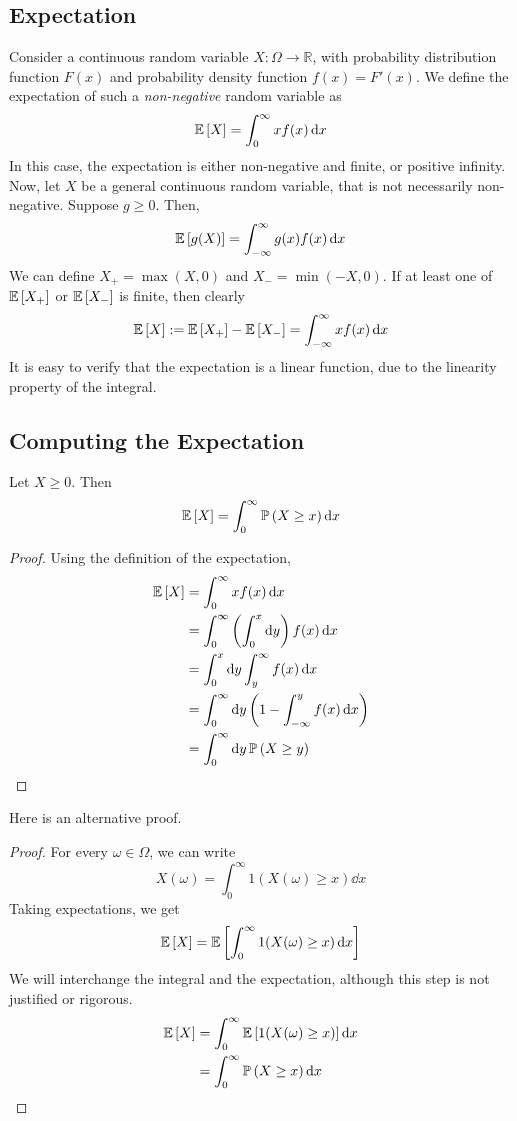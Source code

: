 \subsection{Expectation}
Consider a continuous random variable \(X \colon \Omega \to \mathbb R\), with probability distribution function \(F(x)\) and probability density function \(f(x) = F'(x)\).
We define the expectation of such a \textit{non-negative} random variable as
\[
	\mathbb{E}\left[{X}\right] = \int_0^\infty x f(x) \dd{x}
\]
In this case, the expectation is either non-negative and finite, or positive infinity.
Now, let \(X\) be a general continuous random variable, that is not necessarily non-negative.
Suppose \(g \geq 0\).
Then,
\[
	\mathbb{E}\left[{g(X)}\right] = \int_{-\infty}^\infty g(x) f(x) \dd{x}
\]
We can define \(X_+ = \max(X, 0)\) and \(X_- = \min(-X, 0)\).
If at least one of \(\mathbb{E}\left[{X_+}\right]\) or \(\mathbb{E}\left[{X_-}\right]\) is finite, then clearly
\[
	\mathbb{E}\left[{X}\right] := \mathbb{E}\left[{X_+}\right] - \mathbb{E}\left[{X_-}\right] = \int_{-\infty}^\infty xf(x) \dd{x}
\]
It is easy to verify that the expectation is a linear function, due to the linearity property of the integral.

\subsection{Computing the Expectation}
\begin{claim}
	Let \(X \geq 0\).
	Then
	\[
		\mathbb{E}\left[{X}\right] = \int_0^\infty \mathbb{P}\left({X \geq x}\right) \dd{x}
	\]
\end{claim}
\begin{proof}
	Using the definition of the expectation,
	\begin{align*}
		\mathbb{E}\left[{X}\right] & = \int_0^\infty xf(x) \dd{x}                                           \\
		           & = \int_0^\infty \left( \int_0^x \dd{y} \right) f(x) \dd{x}             \\
		           & = \int_0^x \dd{y} \int_y^\infty f(x) \dd{x}                            \\
		           & = \int_0^\infty \dd{y} \left( 1 - \int_{-\infty}^y f(x) \dd{x} \right) \\
		           & = \int_0^\infty \dd{y} \mathbb{P}\left({X \geq y}\right)
	\end{align*}
\end{proof}
\noindent Here is an alternative proof.
\begin{proof}
	For every \(\omega \in \Omega\), we can write
	\[
		X(\omega) = \int_0^\infty 1(X(\omega) \geq x) \dd{x}
	\]
	Taking expectations, we get
	\[
		\mathbb{E}\left[{X}\right] = \mathbb{E}\left[{\int_0^\infty 1(X(\omega) \geq x) \dd{x}}\right]
	\]
	We will interchange the integral and the expectation, although this step is not justified or rigorous.
	\begin{align*}
		\mathbb{E}\left[{X}\right] & = \int_0^\infty \mathbb{E}\left[{1(X(\omega) \geq x)}\right] \dd{x} \\
		           & = \int_0^\infty \mathbb{P}\left({X \geq x}\right) \dd{x}
	\end{align*}
\end{proof}

